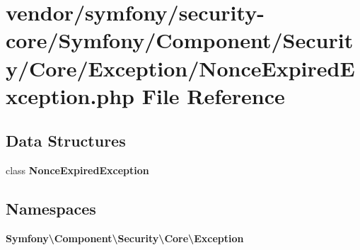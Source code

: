 \section{vendor/symfony/security-\/core/\+Symfony/\+Component/\+Security/\+Core/\+Exception/\+Nonce\+Expired\+Exception.php File Reference}
\label{_nonce_expired_exception_8php}
\subsection*{Data Structures}
\begin{DoxyCompactItemize}
\item 
class {\bf Nonce\+Expired\+Exception}
\end{DoxyCompactItemize}
\subsection*{Namespaces}
\begin{DoxyCompactItemize}
\item 
 {\bf Symfony\textbackslash{}\+Component\textbackslash{}\+Security\textbackslash{}\+Core\textbackslash{}\+Exception}
\end{DoxyCompactItemize}
